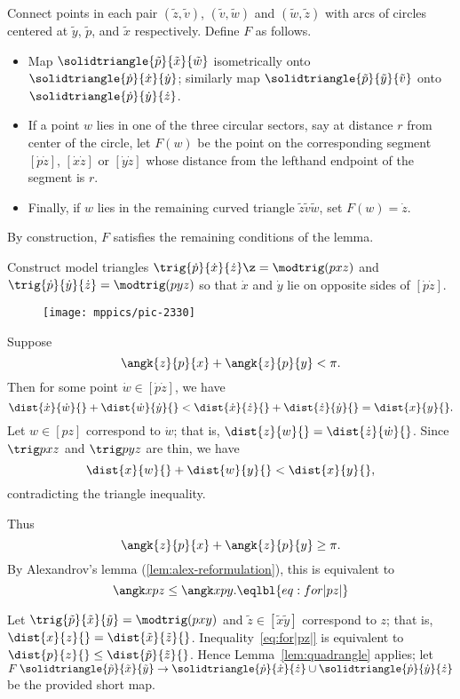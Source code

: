 Connect points in each pair
$(\tilde z,\tilde v)$, 
$(\tilde v,\tilde w)$ 
and $(\tilde w,\tilde z)$ 
with arcs of circles centered at 
$\tilde y$, $\tilde p$, and $\tilde x$ respectively. 
Define $F$ as follows.
\begin{itemize}
\item Map  $\solidtriangle{\tilde p}{\tilde x}{\tilde w}$ isometrically onto  $\solidtriangle {\dot p}{\dot x}{\dot y}$;
similarly map $\solidtriangle{\tilde p}{\tilde y}{\tilde v}$ onto $\solidtriangle {\dot p}{\dot y}{\dot z}$.
\item If a point $w$ lies in one of the three circular sectors, say at distance $r$ from center of the circle, let $F(w)$ be the point on the corresponding segment 
$[\dot p \dot z]$, 
$[\dot x \dot z]$ 
or $[\dot y \dot z]$ whose distance from the lefthand endpoint of the segment is $r$.
\item Finally, if $w$ lies in the remaining curved triangle $\tilde z \tilde v \tilde w$, 
set $F(w) =\dot z$. 
\end{itemize}
By construction, $F$ satisfies the remaining conditions of the lemma. 
\qeds


Construct model triangles $\trig{\dot p}{\dot x}{\dot z}\z=\modtrig(p x z)$ 
and $\trig {\dot p} {\dot y} {\dot z}=\modtrig(p y z)$ so that $\dot x$ and $\dot y$ lie on opposite sides of $[\dot p\dot z]$.

\begin{wrapfigure}{r}{30 mm}
\vskip-0mm
\centering
\texttt{[image: mppics/pic-2330]}
\end{wrapfigure}

Suppose
\[\angk{z}{p}{x}+\angk{z}{p}{y}
<
\pi.\]
Then for some point $\dot w\in[\dot p\dot z]$, we have \[\dist{\dot x}{\dot w}{}+\dist{\dot w}{\dot y}{}
<
\dist{\dot x}{\dot z}{}+\dist{\dot z}{\dot y}{}=\dist{x}{y}{}.\]
Let $w\in[p z]$ correspond to $\dot w$; that is, $\dist{z}{w}{}=\dist{\dot z}{\dot w}{}$. 
Since $\trig p x z$ and $\trig p y z$ are thin, we have 
\[\dist{x}{w}{}+\dist{w}{y}{}<\dist{x}{y}{},\]
contradicting the triangle inequality. 

Thus 
\[\angk{z}{p}{x}+\angk{z}{p}{y}
\ge
\pi.\]
By Alexandrov's lemma (\ref{lem:alex-reformulation}), this is equivalent to 
\[\angk x p z\le\angk x p y.
\eqlbl{eq:for|pz|}\]

Let $\trig{\tilde  p}{\tilde  x}{\tilde  y}=\modtrig (p x y)$ 
and $\tilde  z\in[\tilde  x\tilde  y]$ correspond to $z$; that is, $\dist{x}{z}{}=\dist{\tilde  x}{\tilde  z}{}$.
Inequality~\ref{eq:for|pz|} is equivalent to $\dist{ p}{ z}{}\le \dist{\tilde  p}{\tilde  z}{}$.
Hence  Lemma~\ref{lem:quadrangle} applies;
let $F\:\solidtriangle{\tilde  p}{\tilde  x}{\tilde  y}\to\solidtriangle {\dot p}{\dot x}{\dot z}\cup \solidtriangle {\dot p} {\dot y} {\dot z}$ be the provided short map.

